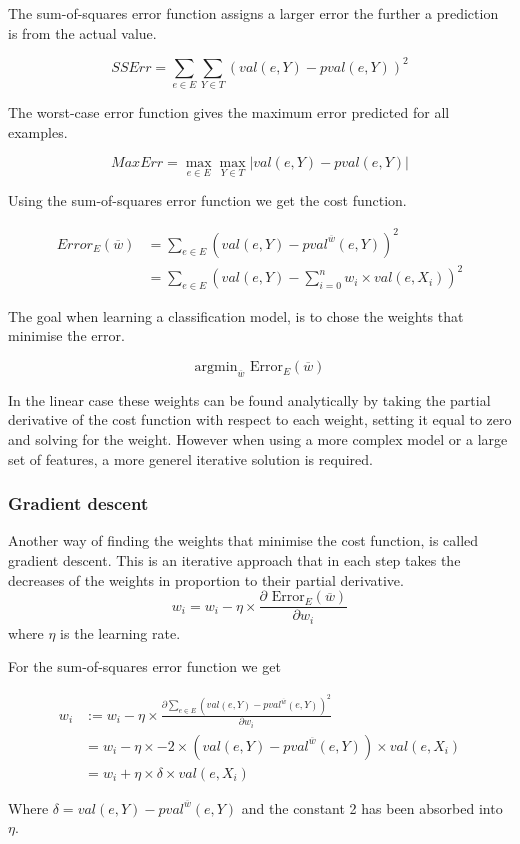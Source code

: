 The sum-of-squares error function assigns a larger error the further a prediction is from the actual value.

\[ SSErr = \sum_{e \in E}\sum_{Y \in T} (val(e,Y) - pval(e,Y))^2 \]

The worst-case error function gives the maximum error predicted for all examples.

\[ MaxErr = \max_{e \in E}\max_{Y \in T} | val(e,Y) - pval(e,Y) | \]

\begin{flushright}
\cite[p. 290-291]{AI2010}
\end{flushright}

Using the sum-of-squares error function we get the cost function.

\begin{align*}
Error_E(\overline{w}) &= \sum_{e \in E} \left(val(e,Y)-pval^{\overline{w}}(e,Y)\right)^2 \\
&= \sum_{e \in E} \left(val(e,Y)-\sum_{i=0}^n w_i \times val(e,X_i)\right)^2
\end{align*}

The goal when learning a classification model, is to chose the weights that minimise the error.

\[ \text{argmin}_{\overline{w}} \text{ Error}_E(\overline{w}) \]

In the linear case these weights can be found analytically by taking the partial derivative of the cost function with respect 
to each weight, setting it equal to zero and solving for the weight.
However when using a more complex model or a large set of features, a more generel iterative solution is required.

\subsubsection{Gradient descent}

Another way of finding the weights that minimise the cost function, is called gradient descent.
This is an iterative approach that in each step takes the decreases of the weights in
proportion to their partial derivative.
\[ w_i = w_i - \eta \times \frac{\partial \text{ Error}_E(\overline{w})}{\partial w_i} \]
where $\eta$ is the learning rate.

For the sum-of-squares error function we get

\begin{align*}
w_i &:= w_i - \eta \times \frac{\partial \sum_{e \in E}\left(val(e,Y) - pval^{\overline{w}}(e,Y)\right)^2}{\partial w_i} \\ %
&= w_i - \eta \times -2 \times \left(val(e,Y) - pval^{\overline{w}}(e,Y)\right) \times val(e,X_i) \\
&= w_i + \eta \times \delta \times val(e,X_i)
\end{align*}

Where $\delta = val(e,Y) - pval^{\overline{w}}(e,Y)$ and the constant 2 has been absorbed into $\eta$.

\begin{flushright}
\cite[p. 305]{AI2010}
\end{flushright}


